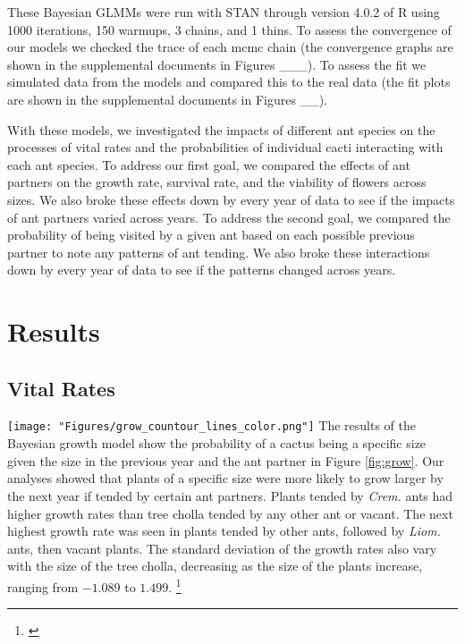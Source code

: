 \documentclass[12pt,a4paper]{article}
\newcommand{\ali}[2]{{\color{pink}{#1}}\footnote{\textit{\color{pink}{#2}}}}
\begin{document}
{{These Bayesian GLMMs were run with STAN through version 4.0.2  of R using 1000 iterations, 150 warmups, 3 chains, and 1 thins. 
To assess the convergence of our models we checked the trace of each mcmc chain (the convergence graphs are shown in the supplemental documents in Figures ___).
To assess the fit we simulated data from the models and compared this to the real data (the fit plots are shown in the supplemental documents in Figures __).

With these models, we investigated the impacts of different ant species on the processes of vital rates and the probabilities of individual cacti interacting with each ant species.
To address our first goal, we compared the effects of ant partners on the growth rate, survival rate, and the viability of flowers across sizes. 
We also broke these effects down by every year of data to see if the impacts of ant partners varied across years. 
To address the second goal, we compared the probability of being visited by a given ant based on each possible previous partner to note any patterns of ant tending. 
We also broke these interactions down by every year of data to see if the patterns changed across years. 

\vspace{1cm}


\section*{Results}
\subsection*{Vital Rates}
\texttt{[image: "Figures/grow\_countour\_lines\_color.png"]}
The results of the Bayesian growth model show the probability of a cactus being a specific size given the size in the previous year and the ant partner in Figure \ref{fig:grow}.
Our analyses showed that plants of a specific size were more likely to grow larger by the next year if tended by certain ant partners. 
Plants tended by \textit{Crem.} ants had higher growth rates than tree cholla tended by any other ant or vacant. 
The next highest growth rate was seen in plants tended by other ants, followed by \textit{Liom.} ants, then vacant plants. 
The standard deviation of the growth rates also vary with the size of the tree cholla, decreasing as the size of the plants increase, ranging from $-1.089$ to $1.499$.
\ali{ }{I’m really unsure about what else I should say about this. }

}}
\end{document}
